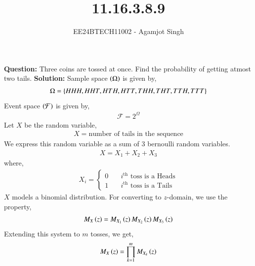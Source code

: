 \documentclass[journal]{IEEEtran}
\begin{document}

\vspace{3cm}

\title{11.16.3.8.9}
\author{EE24BTECH11002 - Agamjot Singh}
{\let\newpage\relax\maketitle}

\renewcommand{\thefigure}{\theenumi}
\renewcommand{\thetable}{\theenumi}
\setlength{\intextsep}{10pt} %

\textbf{Question:}
\newline
Three coins are tossed at once. Find the probability of getting atmost two tails.
\textbf{Solution:}
\newline
Sample space $\left(\Omega\right)$ is given by,
\begin{align}
    \Omega = \left\{HHH, HHT, HTH, HTT, THH, THT, TTH, TTT\right\}
\end{align}
Event space $\left(\mathcal{F}\right)$ is given by,
\begin{align}
    \mathcal{F} = 2^{\Omega}
\end{align}
Let $X$ be the random variable,
\begin{align}
    X = \text{number of tails in the sequence}
\end{align}
We express this random variable as a sum of $3$ bernoulli random variables.
\begin{align}
    X = X_1 + X_2 + X_3
\end{align}
where,
\begin{align}
    X_{i} = \begin{cases}
        0 & \quad i^{\text{th}} \text{ toss is a Heads}\\
        1 & \quad i^{\text{th}} \text{ toss is a Tails}
    \end{cases}
\end{align}
$X$ models a binomial distribution.
\newline
For converting to $z$-domain, we use the property,
\begin{align}
    M_{X}\left(z\right) = M_{X_1}\left(z\right) M_{X_2}\left(z\right) M_{X_3}\left(z\right)
\end{align}
Extending this system to $m$ tosses, we get, 
\begin{align}
    M_{X}\left(z\right) = \prod_{k = 1}^{m} M_{X_{k}}\left(z\right)
\end{align}
\end{document}
